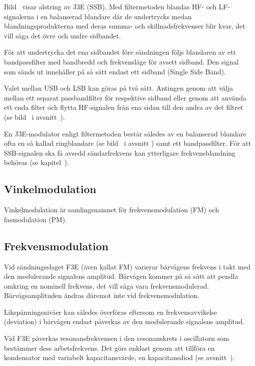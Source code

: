 Bild~ visar alstring av J3E (SSB).
Med filtermetoden blandas HF- och LF-signalerna i en balanserad blandare där de
undertrycks medan blandningsprodukterna med deras summa- och
skillnadsfrekvenser blir kvar, det vill säga det övre och undre sidbandet.

För att undertrycka det ena sidbandet före sändningen följs blandaren
av ett bandpassfilter med bandbredd och frekvensläge för avsett sidband.
Den signal som sänds ut innehåller på så sätt endast ett sidband (Single Side
Band).

Valet mellan USB och LSB kan göras på två sätt.
Antingen genom att välja mellan ett separat passbandfilter för respektive
sidband eller genom att använda ett enda filter och flytta HF-signalen från ena
sidan till den andra av det filtret (se bild~ i
avsnitt~).

En J3E-modulator enligt filtermetoden består således av en balanserad blandare
ofta en så kallad ringblandare (se bild~ i avsnitt
) samt ett bandpassfilter.
För att SSB-signalen ska få avsedd sändarfrekvens kan ytterligare
frekvensblandning behövas (se kapitel~).

\subsection{Vinkelmodulation}

Vinkelmodulation är samlingsnamnet för frekvensmodulation (FM) och
fasmodulation (PM).

\subsection{Frekvensmodulation}

Vid sändningsslaget F3E (även kallat FM) varierar bärvågens frekvens i
takt med den modulerande signalens amplitud.
Bärvågen kommer på så sätt att pendla omkring en nominell frekvens, det vill
säga vara frekvensmodulerad.
Bärvågsamplituden ändras däremot inte vid frekvensmodulation.

Likspänningsnivåer kan således överföras eftersom en frekvensavvikelse
(deviation) i bärvågen endast påverkas av den modulerande signalens amplitud.

Vid F3E påverkas resonansfrekvensen i den resonanskrets i oscillatorn som
bestämmer dess arbetsfrekvens.
Det görs enklast genom att tillföra en kondensator med variabelt
kapacitansvärde, en kapacitansdiod (se avsnitt~).


